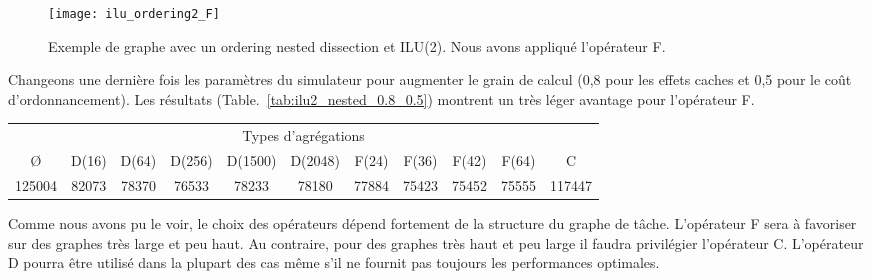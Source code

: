\begin{figure}[t!]
  \centering
  \texttt{[image: ilu\_ordering2\_F]}
  \caption{Exemple de graphe avec un ordering nested dissection et ILU(2). Nous avons appliqué l'opérateur F.}
  \label{fig:ilu_ordering2_F}
\end{figure}


Changeons une dernière fois les paramètres du simulateur pour augmenter le grain de calcul (0,8 pour les effets caches et 0,5 pour le coût d'ordonnancement).
%
Les résultats (Table.~\ref{tab:ilu2_nested_0.8_0.5}) montrent un très léger avantage pour l'opérateur F.


\begin{center}
  \begin{tabular}{|c|c|c|c|c|c|c|c|c|c|c|}
    \hline
    \multicolumn{11}{|c|}{Types d'agrégations}\\
    \O & D(16) & D(64) & D(256) & D(1500) & D(2048) & F(24) & F(36) & F(42) & F(64) & C \\
    \hline
    125004 & 82073 & 78370 & 76533 & 78233 & 78180 & 77884 & 75423 & 75452 & 75555 & 117447 \\
    \hline
  \end{tabular}
  \label{tab:ilu2_nested_0.8_0.5}
\end{center}


Comme nous avons pu le voir, le choix des opérateurs dépend fortement de la structure du graphe de tâche.
%
L'opérateur F sera à favoriser sur des graphes très large et peu haut.
%
Au contraire, pour des graphes très haut et peu large il faudra privilégier l'opérateur C.
%
L'opérateur D pourra être utilisé dans la plupart des cas même s'il ne fournit pas toujours les performances optimales.

